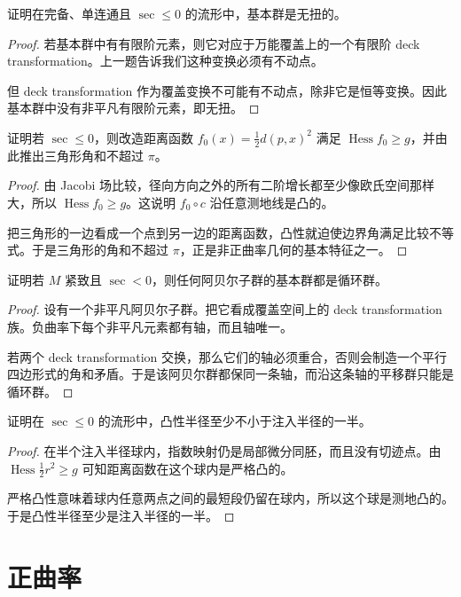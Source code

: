 \documentclass[11pt,a4paper,openany]{ctexbook}
\numberwithin{equation}{chapter}
\begin{document}
\begin{exercise}
证明在完备、单连通且 \(\sec\le 0\) 的流形中，基本群是无扭的。
\end{exercise}
\begin{proof}
若基本群中有有限阶元素，则它对应于万能覆盖上的一个有限阶 deck transformation。上一题告诉我们这种变换必须有不动点。

但 deck transformation 作为覆盖变换不可能有不动点，除非它是恒等变换。因此基本群中没有非平凡有限阶元素，即无扭。
\end{proof}

\begin{exercise}
证明若 \(\sec\le 0\)，则改造距离函数 \(f_0(x)=\frac12 d(p,x)^2\) 满足 \(\operatorname{Hess} f_0\ge g\)，并由此推出三角形角和不超过 \(\pi\)。
\end{exercise}
\begin{proof}
由 Jacobi 场比较，径向方向之外的所有二阶增长都至少像欧氏空间那样大，所以 \(\operatorname{Hess}f_0\ge g\)。这说明 \(f_0\circ c\) 沿任意测地线是凸的。

把三角形的一边看成一个点到另一边的距离函数，凸性就迫使边界角满足比较不等式。于是三角形的角和不超过 \(\pi\)，正是非正曲率几何的基本特征之一。
\end{proof}

\begin{exercise}
证明若 \(M\) 紧致且 \(\sec<0\)，则任何阿贝尔子群的基本群都是循环群。
\end{exercise}
\begin{proof}
设有一个非平凡阿贝尔子群。把它看成覆盖空间上的 deck transformation 族。负曲率下每个非平凡元素都有轴，而且轴唯一。

若两个 deck transformation 交换，那么它们的轴必须重合，否则会制造一个平行四边形式的角和矛盾。于是该阿贝尔群都保同一条轴，而沿这条轴的平移群只能是循环群。
\end{proof}

\begin{exercise}
证明在 \(\sec\le 0\) 的流形中，凸性半径至少不小于注入半径的一半。
\end{exercise}
\begin{proof}
在半个注入半径球内，指数映射仍是局部微分同胚，而且没有切迹点。由 \(\operatorname{Hess}\frac12 r^2\ge g\) 可知距离函数在这个球内是严格凸的。

严格凸性意味着球内任意两点之间的最短段仍留在球内，所以这个球是测地凸的。于是凸性半径至少是注入半径的一半。
\end{proof}
\section{正曲率}
\end{document}
